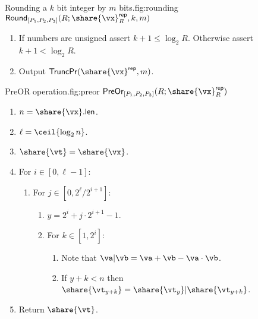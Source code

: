 \begin{Boxfig}{Rounding a $k$ bit integer by $m$ bits.}{fig:rounding}
  {$\mathsf{Round}_{[P_1, P_2, P_3]}(R; \share{\vx}^\mathsf{rep}_R, k, m)$}
  \begin{enumerate}
  \item If numbers are unsigned assert $k + 1 \leq \log_2{R}$. Otherwise assert $k+1 < \log_2{R}$.
  \item Output $\mathsf{TruncPr}(\share{\vx}^\mathsf{rep}, m)$.
\end{enumerate}
\end{Boxfig}

\begin{Boxfig}{PreOR operation.}{fig:preor}
  {$\mathsf{PreOr}_{[P_1, P_2, P_3]}(R; \share{\vx}^\mathsf{rep}_R)$}
  \begin{enumerate}
    \item $n = \share{\vx}.\mathsf{len}$.
    \item $\ell = \ceil{\log_2{n}}$.
    \item $\share{\vt} = \share{\vx}$.
    \item For $i \in [0, \ell-1]$:
    \begin{enumerate}
      \item For $j \in [0, 2^\ell/2^{i+1}]$:
      \begin{enumerate}
        \item $y = 2^i + j \cdot 2^{i+1} - 1$.
        \item For $k \in [1, 2^i]$:
        \begin{enumerate}
            \item Note that $\va | \vb = \va + \vb - \va \cdot \vb$.
            \item If $y + k < n$ then $\share{\vt_{y+k}} = \share{\vt_y} | \share{\vt_{y + k}}$.
        \end{enumerate}
      \end{enumerate}
    \end{enumerate}
    \item Return $\share{\vt}$.
\end{enumerate}
\end{Boxfig}

